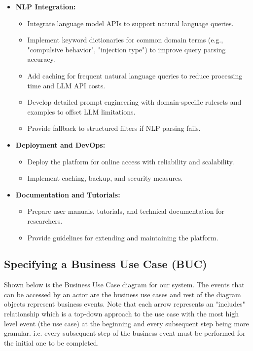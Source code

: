 \documentclass[12pt]{article}
\begin{document}
\begin{itemize}
    \item \textbf{NLP Integration:} 
        \begin{itemize}
            \item Integrate language model APIs to support natural language queries.
            \item Implement keyword dictionaries for common domain terms (e.g., "compulsive behavior", "injection type") to improve query parsing accuracy.
            \item Add caching for frequent natural language queries to reduce processing time and LLM API costs.
            \item Develop detailed prompt engineering with domain-specific rulesets and examples to offset LLM limitations.
            \item Provide fallback to structured filters if NLP parsing fails.
        \end{itemize}
        
    \item \textbf{Deployment and DevOps:} 
        \begin{itemize}
            \item Deploy the platform for online access with reliability and scalability.
            \item Implement caching, backup, and security measures.
        \end{itemize}
        
    \item \textbf{Documentation and Tutorials:} 
        \begin{itemize}
            \item Prepare user manuals, tutorials, and technical documentation for researchers.
            \item Provide guidelines for extending and maintaining the platform.
        \end{itemize}
\end{itemize}



\subsection{Specifying a Business Use Case (BUC)}

\par{ Shown below is the Business Use Case diagram for our system. The
events that can be accessed by an actor are the business use cases and rest of the
diagram objects represent business events.\newline\newline
\indent Note that each arrow represents an "includes" relationship which is a top-down approach
to the use case with the most high level event (the use case) at the beginning and every subsequent step
being more granular. i.e. every subsequent step of the business event must be performed for the initial one to be completed. }
\end{document}
